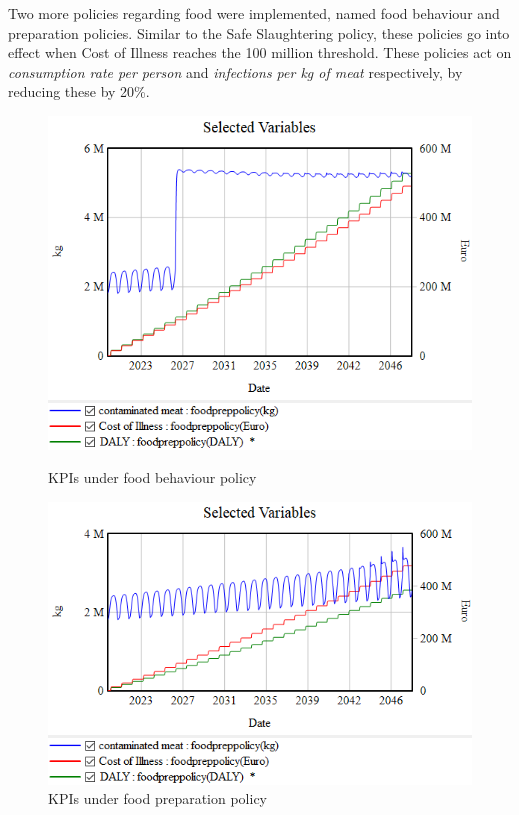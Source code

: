 Two more policies regarding food were implemented, named food behaviour and preparation policies. Similar to the Safe Slaughtering policy, these policies go into effect when Cost of Illness reaches the 100 million threshold. These policies act on
\textit{consumption rate per person} and \textit{infections per kg of meat} respectively, by reducing these by 20\%.  

\begin{figure}[h!]
    \centering
    \begin{minipage}{0.45\textwidth}
        \centering
        \includegraphics[width=1\textwidth]{images/foodbehaviourpolicy.png} 
        \caption{KPIs under food behaviour policy}
        \label{fig:foodbehav}
    \end{minipage}\hfill
    \begin{minipage}{0.45\textwidth}
        \centering
        \includegraphics[width=1\textwidth]{images/foodpreparationpolicy.png}
        \caption{KPIs under food preparation policy}
        \label{fig:foodprep}
    \end{minipage}
\end{figure}
